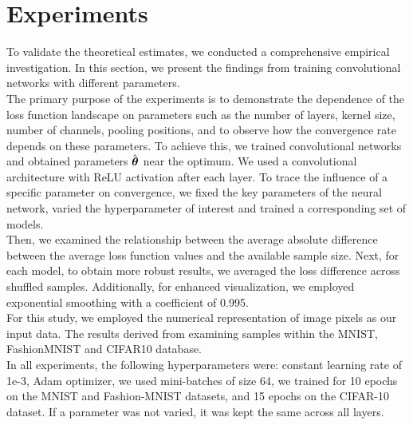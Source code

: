 \documentclass[conference]{IEEEtran}
\begin{document}
\section{Experiments}\label{sec:exp}
To validate the theoretical estimates, we conducted a comprehensive empirical investigation. In this section, we present the findings from training convolutional networks with different parameters. \\
The primary purpose of the experiments is to demonstrate the dependence of the loss function landscape on parameters such as the number of layers, kernel size, number of channels, pooling positions, and to observe how the convergence rate depends on these parameters. To achieve this, we trained convolutional networks and obtained parameters $\hat{\boldsymbol{\theta}}$ near the optimum.
We used a convolutional architecture with ReLU activation after each layer. To trace the influence of a specific parameter on convergence, we fixed the key parameters of the neural network, varied the hyperparameter of interest and trained a corresponding set of models. \\
Then, we examined the relationship between the average absolute difference between the average loss function values and the available sample size. Next, for each model, to obtain more robust results, we averaged the loss difference across shuffled samples. Additionally, for enhanced visualization, we employed exponential smoothing with a coefficient of 0.995. \\
For this study, we employed the numerical representation of image pixels as our input data. The results derived from examining samples within the MNIST\cite{MNIST}, FashionMNIST\cite{xiao2017fashionmnistnovelimagedataset} and CIFAR10\cite{CIFAR10} database. \\
In all experiments, the following hyperparameters were:
constant learning rate of 1e-3, Adam optimizer, we used mini-batches of size 64, we trained for 10 epochs on the MNIST and Fashion-MNIST datasets, and 15 epochs on the CIFAR-10 dataset.
If a parameter was not varied, it was kept the same across all layers.
\end{document}
